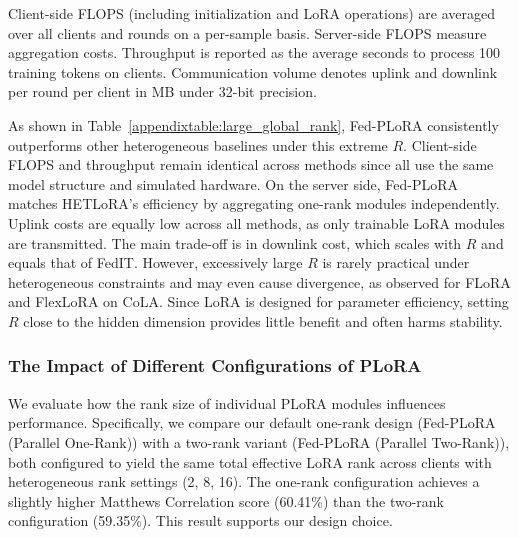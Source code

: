 \documentclass{article} %
\begin{document}
Client-side FLOPS (including initialization and LoRA operations) are averaged over all clients and rounds on a per-sample basis. Server-side FLOPS measure aggregation costs. Throughput is reported as the average seconds to process 100 training tokens on clients. Communication volume denotes uplink and downlink per round per client in MB under 32-bit precision.

As shown in Table~\ref{appendixtable:large_global_rank}, Fed-PLoRA consistently outperforms other heterogeneous baselines under this extreme $R$. Client-side FLOPS and throughput remain identical across methods since all use the same model structure and simulated hardware. On the server side, Fed-PLoRA matches HETLoRA’s efficiency by aggregating one-rank modules independently. Uplink costs are equally low across all methods, as only trainable LoRA modules are transmitted. The main trade-off is in downlink cost, which scales with $R$ and equals that of FedIT. However, excessively large $R$ is rarely practical under heterogeneous constraints and may even cause divergence, as observed for FLoRA and FlexLoRA on CoLA. Since LoRA is designed for parameter efficiency, setting $R$ close to the hidden dimension provides little benefit and often harms stability. 

\subsubsection{The Impact of Different Configurations of PLoRA}\label{appendixsubsection:plora_rank}


We evaluate how the rank size of individual PLoRA modules influences performance. Specifically, we compare our default one-rank design (Fed-PLoRA (Parallel One-Rank)) with a two-rank variant (Fed-PLoRA (Parallel Two-Rank)), both configured to yield the same total effective LoRA rank across clients with heterogeneous rank settings (2, 8, 16). The one-rank configuration achieves a slightly higher Matthews Correlation score (60.41\%) than the two-rank configuration (59.35\%). This result supports our design choice.  %
\end{document}
